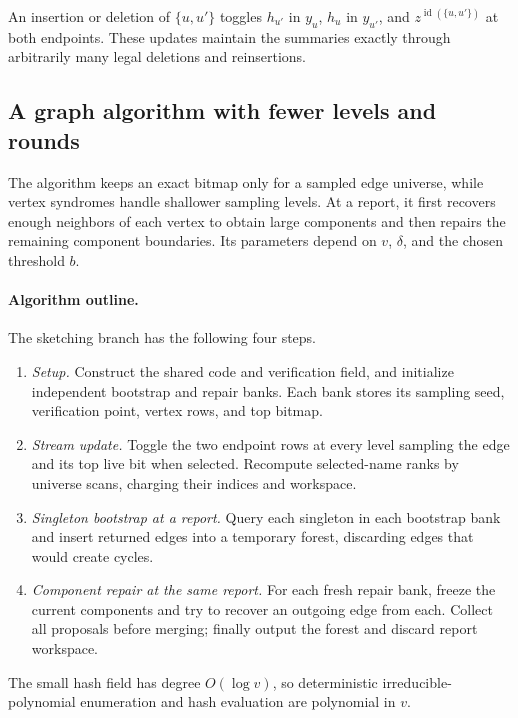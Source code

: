 \documentclass[11pt,letterpaper]{article}
\numberwithin{equation}{section}
\begin{document}
An insertion or deletion of $\{u,u'\}$ toggles $h_{u'}$ in $y_u$, $h_u$ in $y_{u'}$, and $z^{\operatorname{id}(\{u,u'\})}$ at both endpoints.
These updates maintain the summaries exactly through arbitrarily many legal deletions and reinsertions.

\subsection{A graph algorithm with fewer levels and rounds}
\label{sec:forest-bitmap-bootstrap}

The algorithm keeps an exact bitmap only for a sampled edge universe, while vertex syndromes handle shallower sampling levels.
At a report, it first recovers enough neighbors of each vertex to obtain large components and then repairs the remaining component boundaries.
Its parameters depend on $v$, $\delta$, and the chosen threshold $b$.

\par\medskip
\noindent\begin{minipage}{\linewidth}
\paragraph{Algorithm outline.}
The sketching branch has the following four steps.
\begin{enumerate}
\item \emph{Setup.} Construct the shared code and verification field, and initialize independent bootstrap and repair banks. Each bank stores its sampling seed, verification point, vertex rows, and top bitmap.
\item \emph{Stream update.} Toggle the two endpoint rows at every level sampling the edge and its top live bit when selected. Recompute selected-name ranks by universe scans, charging their indices and workspace.
\item \emph{Singleton bootstrap at a report.} Query each singleton in each bootstrap bank and insert returned edges into a temporary forest, discarding edges that would create cycles.
\item \emph{Component repair at the same report.} For each fresh repair bank, freeze the current components and try to recover an outgoing edge from each. Collect all proposals before merging; finally output the forest and discard report workspace.
\end{enumerate}
\end{minipage}
\par\medskip
The small hash field has degree $O(\log v)$, so deterministic irreducible-polynomial enumeration and hash evaluation are polynomial in $v$.
\end{document}
